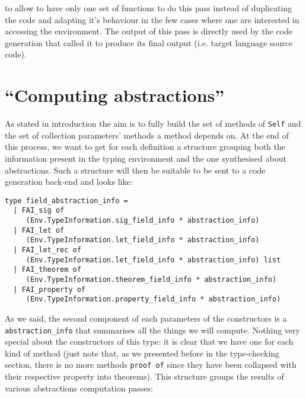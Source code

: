 \noindent to allow to have only one set of functions to do this pass
instead of duplicating the code and adapting it's behaviour in the few
cases where one are interested in accessing the environment. The
output of this pass is directly used by the code generation that
called it to produce its final output (i.e. target language source
code).



\section{``Computing abstractions''}
As stated in introduction the aim is to fully build the set of
methods of {\tt Self} and the set of collection parameters' methods a
method depends on. At the end of this process, we want to get for each
definition a structure grouping both the information present in the
typing environment and the one synthesised about abstractions. Such a
structure will then be suitable to be sent to a code generation
back-end and looks like:

{\footnotesize
\begin{lstlisting}[language=MyOCaml]
type field_abstraction_info =
  | FAI_sig of
     (Env.TypeInformation.sig_field_info * abstraction_info)
  | FAI_let of
     (Env.TypeInformation.let_field_info * abstraction_info)
  | FAI_let_rec of
     (Env.TypeInformation.let_field_info * abstraction_info) list
  | FAI_theorem of
     (Env.TypeInformation.theorem_field_info * abstraction_info)
  | FAI_property of
     (Env.TypeInformation.property_field_info * abstraction_info)
\end{lstlisting}
}

As we said, the second component of each parameters of the
constructors is a {\tt abstraction\_info} that summarises all the
things we will compute. Nothing very special about the constructors of
this type: it is clear that we have one for each kind of method (just
note that, as we presented before in the type-checking section, there
is no more methods {\tt proof of} since they have been collapsed with
their respective property into theorems). This structure groups the
results of various abstractions computation passes:

